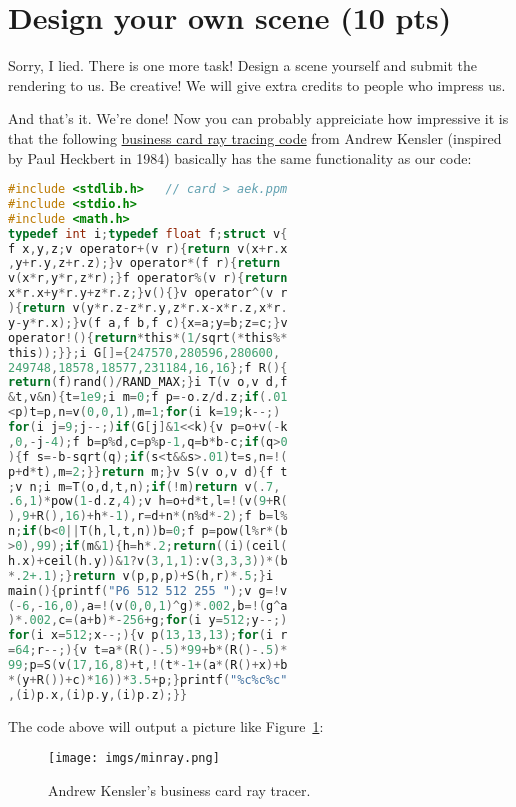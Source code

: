 \section{Design your own scene (10 pts)}
\label{sec:design_your_own}

Sorry, I lied. There is one more task! Design a scene yourself and submit the rendering to us. Be creative! We will give extra credits to people who impress us.

And that's it. We're done! Now you can probably appreiciate how impressive it is that the following \href{https://fabiensanglard.net/rayTracing_back_of_business_card/}{business card ray tracing code} from Andrew Kensler (inspired by Paul Heckbert in 1984) basically has the same functionality as our code:
\begin{lstlisting}[language=C]
#include <stdlib.h>   // card > aek.ppm
#include <stdio.h>
#include <math.h>
typedef int i;typedef float f;struct v{
f x,y,z;v operator+(v r){return v(x+r.x
,y+r.y,z+r.z);}v operator*(f r){return
v(x*r,y*r,z*r);}f operator%(v r){return
x*r.x+y*r.y+z*r.z;}v(){}v operator^(v r
){return v(y*r.z-z*r.y,z*r.x-x*r.z,x*r.
y-y*r.x);}v(f a,f b,f c){x=a;y=b;z=c;}v
operator!(){return*this*(1/sqrt(*this%*
this));}};i G[]={247570,280596,280600,
249748,18578,18577,231184,16,16};f R(){
return(f)rand()/RAND_MAX;}i T(v o,v d,f
&t,v&n){t=1e9;i m=0;f p=-o.z/d.z;if(.01
<p)t=p,n=v(0,0,1),m=1;for(i k=19;k--;)
for(i j=9;j--;)if(G[j]&1<<k){v p=o+v(-k
,0,-j-4);f b=p%d,c=p%p-1,q=b*b-c;if(q>0
){f s=-b-sqrt(q);if(s<t&&s>.01)t=s,n=!(
p+d*t),m=2;}}return m;}v S(v o,v d){f t
;v n;i m=T(o,d,t,n);if(!m)return v(.7,
.6,1)*pow(1-d.z,4);v h=o+d*t,l=!(v(9+R(
),9+R(),16)+h*-1),r=d+n*(n%d*-2);f b=l%
n;if(b<0||T(h,l,t,n))b=0;f p=pow(l%r*(b
>0),99);if(m&1){h=h*.2;return((i)(ceil(
h.x)+ceil(h.y))&1?v(3,1,1):v(3,3,3))*(b
*.2+.1);}return v(p,p,p)+S(h,r)*.5;}i
main(){printf("P6 512 512 255 ");v g=!v
(-6,-16,0),a=!(v(0,0,1)^g)*.002,b=!(g^a
)*.002,c=(a+b)*-256+g;for(i y=512;y--;)
for(i x=512;x--;){v p(13,13,13);for(i r
=64;r--;){v t=a*(R()-.5)*99+b*(R()-.5)*
99;p=S(v(17,16,8)+t,!(t*-1+(a*(R()+x)+b
*(y+R())+c)*16))*3.5+p;}printf("%c%c%c"
,(i)p.x,(i)p.y,(i)p.z);}}
\end{lstlisting}

The code above will output a picture like Figure~\ref{fig:business_card}:
\begin{figure}[ht]
    \centering
    \texttt{[image: imgs/minray.png]}
    \caption{Andrew Kensler's business card ray tracer.}
    \label{fig:business_card}
\end{figure}


